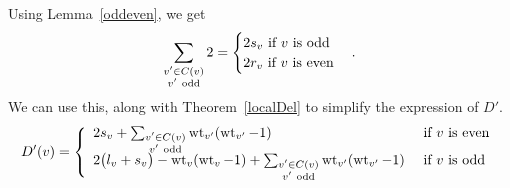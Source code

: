  Using Lemma~\ref{oddeven}, we get  
 \[ \sum_{\substack{v' \in C(v) \\ v' \ \textrm{odd}}} 2 = \begin{cases}2s_v \ \textup{if $v$ is odd} \\ 2r_v \ \textup{if $v$ is even} \end{cases} .\]
 We can use this, along with Theorem~\ref{localDel} to simplify the expression of $D'$. 
 \begin{equation}\label{formulaforD'} D'(v) = \left\{ { \begin{array}{ll}
            2s_v + \sum_{\substack{v' \in C(v) \\ v' \ \textrm{odd}}}  \wt_{v'}(\wt_{v'}-1)   \ &\textup{if $v$ is even} \\
            2 \big(l_v+s_v \big) - \wt_v(\wt_v-1)  + \sum_{\substack{v' \in C(v) \\ v' \ \textrm{odd}}} \wt_{v'}(\wt_{v'}-1)   \ &\textup{if $v$ is odd}
           \end{array} } \right .
 \end{equation}
 
